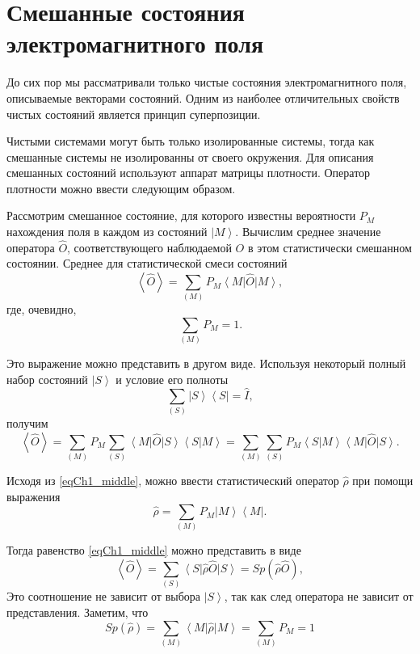 \section{Смешанные состояния электромагнитного поля}
До сих пор мы рассматривали только чистые состояния электромагнитного
поля, описываемые векторами состояний. 
Одним из наиболее отличительных свойств чистых состояний является
принцип суперпозиции. 

Чистыми системами могут быть только изолированные системы, тогда как
смешанные системы не изолированны от своего окружения. Для описания
смешанных состояний используют аппарат матрицы плотности. Оператор
плотности можно ввести следующим образом.  

Рассмотрим смешанное состояние, для которого известны вероятности
$P_M$
нахождения поля в каждом из состояний 
$\left|M\right>$.  Вычислим среднее значение
оператора $\hat{O}$,  соответствующего наблюдаемой $O$ в этом статистически
смешанном состоянии. Среднее для статистической смеси состояний  
\begin{equation}
\left<\hat{O}\right> = \sum_{(M)} P_M\left<M\right|\hat{O}\left|M\right>,
\end{equation}
где, очевидно, 
\[
\sum_{(M)} P_M = 1.
\]

Это выражение можно представить в другом виде. Используя некоторый
полный набор состояний $\left|S\right>$   и условие его полноты 
\[
\sum_{(S)}\left|S\right>\left<S\right| = \hat{I},
\]
получим
\begin{equation}
\left<\hat{O}\right> = \sum_{(M)}
P_M\sum_{(S)}\left<M\right|\hat{O}\left|S\right>\left<S\right|\left.M\right>
= \sum_{(M)}\sum_{(S)}P_M\left<S\right|\left.M\right>\left<M\right|\hat{O}\left|S\right>.
\label{eqCh1_middle}
\end{equation}

Исходя из \eqref{eqCh1_middle}, можно ввести статистический оператор $\hat{\rho}$  при помощи выражения
\begin{equation}
\hat{\rho} = \sum_{(M)}
P_M\left|M\right>\left<M\right|.
\end{equation}

Тогда равенство \eqref{eqCh1_middle} можно представить в виде
\begin{equation}
\left<\hat{O}\right> = \sum_{(S)}
\left<S\right|\hat{\rho}\hat{O}\left|S\right> = Sp \left(\hat{\rho}\hat{O}\right),
\end{equation}
Это соотношение не зависит от выбора  $\left|S\right>$,  так как след
оператора не зависит от представления. Заметим, что 
\begin{equation}
Sp \left(\hat{\rho}\right) = \sum_{(M)}
\left<M\right|\hat{\rho}\left|M\right> = \sum_{(M)} P_M = 1
\label{eqCh1_spequal1}
\end{equation}

